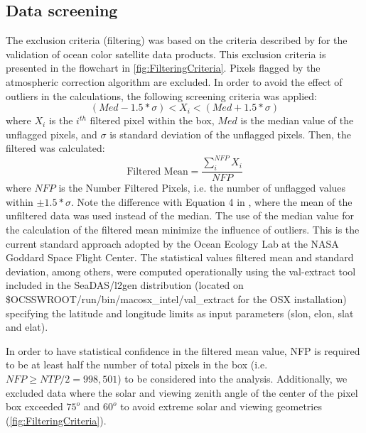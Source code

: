 \documentclass[onecolumn,3p,letterpaper,11pt]{elsarticle}
\begin{document}
\subsection{Data screening}
The exclusion criteria (filtering) was based on the criteria described by \citet{Bailey2006} for the validation of ocean color satellite data products. This exclusion criteria is presented in the flowchart in \autoref{fig:FilteringCriteria}. Pixels flagged by the atmospheric correction algorithm are excluded. In order to avoid the effect of outliers in the calculations, the following screening criteria was applied:
\begin{equation}
  (Med-1.5*\sigma) <  X_i < (Med+1.5*\sigma)
\end{equation}
where $X_i$ is the $i^{th}$ filtered pixel within the box, $Med$ is the median value of the unflagged pixels, and $\sigma$ is standard deviation of the unflagged pixels. Then, the filtered was calculated:
\begin{equation}\label{eq:filteredmean}
  \text{Filtered Mean} =\frac{\displaystyle \sum_i^{NFP} X_i}{NFP}
\end{equation}
where $NFP$ is the Number Filtered Pixels, i.e. the number of unflagged values within $\pm 1.5*\sigma$. Note the difference with Equation 4 in \citet{Bailey2006}, where the mean of the unfiltered data was used instead of the median. The use of the median value for the calculation of the filtered mean minimize the influence of outliers. This is the current standard approach adopted by the Ocean Ecology Lab at the NASA Goddard Space Flight Center. The statistical values filtered mean and standard deviation, among others, were computed operationally using the val-extract tool included in the SeaDAS/l2gen distribution (located on {\ttfamily \$OCSSWROOT/run/bin/macosx\_intel/val\_extract}  for the OSX installation) specifying the latitude and longitude limits as input parameters (slon, elon, slat and elat).

In order to have statistical confidence in the filtered mean value, NFP is required to be at least half the number of total pixels in the box (i.e. $NFP\geq NTP/2 = 998,501$) to be considered into the analysis. Additionally, we excluded data where the solar and viewing zenith angle of the center of the pixel box exceeded $75^o$ and $60^o$ to avoid extreme solar and  viewing geometries \citep{Bailey2006} (\autoref{fig:FilteringCriteria}).
\end{document}
